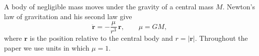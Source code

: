 A body of negligible mass moves under the gravity of a central mass $M$.
Newton's law of gravitation and his second law give
\begin{equation}
  \ddot{\mathbf r} = -\frac{\mu}{r^3}\,\mathbf r, \qquad \mu = GM,
\end{equation}
where $\mathbf r$ is the position relative to the central body and $r = |\mathbf r|$.
Throughout the paper we use units in which $\mu = 1$.
